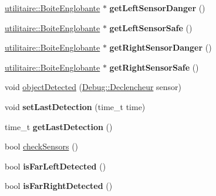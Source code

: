 \begin{DoxyCompactItemize}
\item 
\hypertarget{class_noeud_robot_a6c57765cd79030d5dd242b3c5e43cf4a}{\hyperlink{structutilitaire_1_1_boite_englobante}{utilitaire\-::\-Boite\-Englobante} $\ast$ {\bfseries get\-Left\-Sensor\-Danger} ()}\label{class_noeud_robot_a6c57765cd79030d5dd242b3c5e43cf4a}

\item 
\hypertarget{class_noeud_robot_a8c718495a26a6f59af8059e2c9e1917d}{\hyperlink{structutilitaire_1_1_boite_englobante}{utilitaire\-::\-Boite\-Englobante} $\ast$ {\bfseries get\-Left\-Sensor\-Safe} ()}\label{class_noeud_robot_a8c718495a26a6f59af8059e2c9e1917d}

\item 
\hypertarget{class_noeud_robot_afe1bddcea51dc6fe6b989bd5bb15e38e}{\hyperlink{structutilitaire_1_1_boite_englobante}{utilitaire\-::\-Boite\-Englobante} $\ast$ {\bfseries get\-Right\-Sensor\-Danger} ()}\label{class_noeud_robot_afe1bddcea51dc6fe6b989bd5bb15e38e}

\item 
\hypertarget{class_noeud_robot_ade14319e8e15999466142777a875aaca}{\hyperlink{structutilitaire_1_1_boite_englobante}{utilitaire\-::\-Boite\-Englobante} $\ast$ {\bfseries get\-Right\-Sensor\-Safe} ()}\label{class_noeud_robot_ade14319e8e15999466142777a875aaca}

\item 
void \hyperlink{group__inf2990_ga3fdf900e74c2634f92abcb164f6ac96a}{object\-Detected} (\hyperlink{class_debug_afd6ed3c50c08d0a7830cd5253b4ab8b6}{Debug\-::\-Declencheur} sensor)
\item 
\hypertarget{class_noeud_robot_a06e111f1ae3b114e5c552c0b21976a4d}{void {\bfseries set\-Last\-Detection} (time\-\_\-t time)}\label{class_noeud_robot_a06e111f1ae3b114e5c552c0b21976a4d}

\item 
\hypertarget{class_noeud_robot_a076816713bf0a5f55a8a53582972d4f1}{time\-\_\-t {\bfseries get\-Last\-Detection} ()}\label{class_noeud_robot_a076816713bf0a5f55a8a53582972d4f1}

\item 
bool \hyperlink{group__inf2990_ga44545d3ce953677f2380423041e2fdc6}{check\-Sensors} ()
\item 
\hypertarget{class_noeud_robot_a6a16426cea4aa7b9aea6b54ff7815a17}{bool {\bfseries is\-Far\-Left\-Detected} ()}\label{class_noeud_robot_a6a16426cea4aa7b9aea6b54ff7815a17}

\item 
\hypertarget{class_noeud_robot_a538f029bf53a3e1645311164c2c21cb3}{bool {\bfseries is\-Far\-Right\-Detected} ()}\label{class_noeud_robot_a538f029bf53a3e1645311164c2c21cb3}


\end{DoxyCompactItemize}
